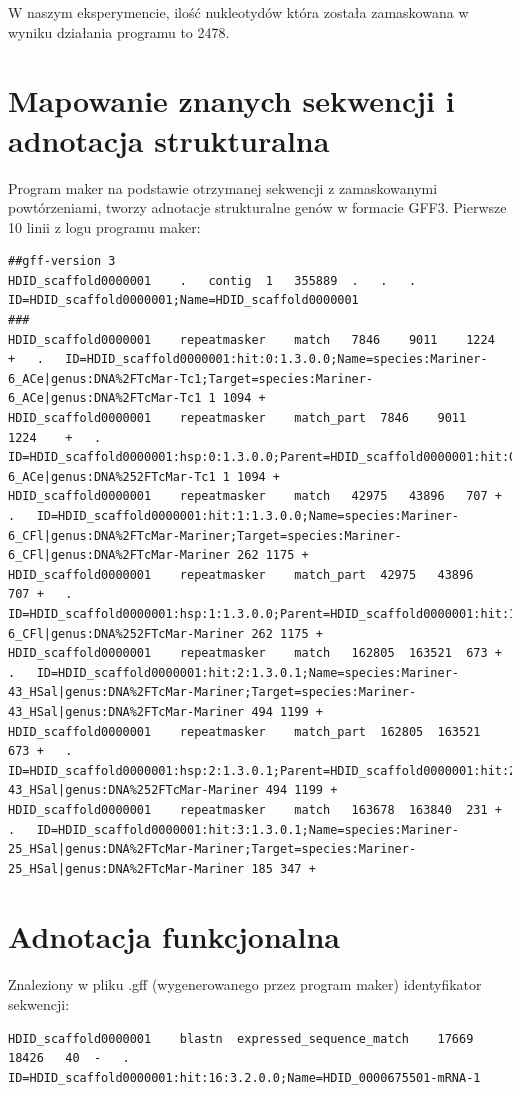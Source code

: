 \documentclass[a4paper]{article}
\begin{document}
W naszym eksperymencie, ilość nukleotydów która została zamaskowana w wyniku działania programu to 2478.

\section{Mapowanie znanych sekwencji i adnotacja strukturalna}

Program maker na podstawie otrzymanej sekwencji z zamaskowanymi powtórzeniami, tworzy adnotacje strukturalne genów w formacie GFF3.
Pierwsze 10 linii z logu programu maker:
\begin{lstlisting}
##gff-version 3
HDID_scaffold0000001	.	contig	1	355889	.	.	.	ID=HDID_scaffold0000001;Name=HDID_scaffold0000001
###
HDID_scaffold0000001	repeatmasker	match	7846	9011	1224	+	.	ID=HDID_scaffold0000001:hit:0:1.3.0.0;Name=species:Mariner-6_ACe|genus:DNA%2FTcMar-Tc1;Target=species:Mariner-6_ACe|genus:DNA%2FTcMar-Tc1 1 1094 +
HDID_scaffold0000001	repeatmasker	match_part	7846	9011	1224	+	.	ID=HDID_scaffold0000001:hsp:0:1.3.0.0;Parent=HDID_scaffold0000001:hit:0:1.3.0.0;Target=species:Mariner-6_ACe|genus:DNA%252FTcMar-Tc1 1 1094 +
HDID_scaffold0000001	repeatmasker	match	42975	43896	707	+	.	ID=HDID_scaffold0000001:hit:1:1.3.0.0;Name=species:Mariner-6_CFl|genus:DNA%2FTcMar-Mariner;Target=species:Mariner-6_CFl|genus:DNA%2FTcMar-Mariner 262 1175 +
HDID_scaffold0000001	repeatmasker	match_part	42975	43896	707	+	.	ID=HDID_scaffold0000001:hsp:1:1.3.0.0;Parent=HDID_scaffold0000001:hit:1:1.3.0.0;Target=species:Mariner-6_CFl|genus:DNA%252FTcMar-Mariner 262 1175 +
HDID_scaffold0000001	repeatmasker	match	162805	163521	673	+	.	ID=HDID_scaffold0000001:hit:2:1.3.0.1;Name=species:Mariner-43_HSal|genus:DNA%2FTcMar-Mariner;Target=species:Mariner-43_HSal|genus:DNA%2FTcMar-Mariner 494 1199 +
HDID_scaffold0000001	repeatmasker	match_part	162805	163521	673	+	.	ID=HDID_scaffold0000001:hsp:2:1.3.0.1;Parent=HDID_scaffold0000001:hit:2:1.3.0.1;Target=species:Mariner-43_HSal|genus:DNA%252FTcMar-Mariner 494 1199 +
HDID_scaffold0000001	repeatmasker	match	163678	163840	231	+	.	ID=HDID_scaffold0000001:hit:3:1.3.0.1;Name=species:Mariner-25_HSal|genus:DNA%2FTcMar-Mariner;Target=species:Mariner-25_HSal|genus:DNA%2FTcMar-Mariner 185 347 +
\end{lstlisting}

\section{Adnotacja funkcjonalna}
Znaleziony w pliku .gff (wygenerowanego przez program maker) identyfikator sekwencji:
\begin{lstlisting}
HDID_scaffold0000001	blastn	expressed_sequence_match	17669	18426	40	-	.	ID=HDID_scaffold0000001:hit:16:3.2.0.0;Name=HDID_0000675501-mRNA-1
\end{lstlisting}
\end{document}
